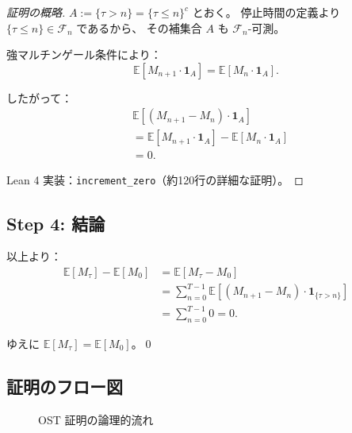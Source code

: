 \documentclass[a4paper,12pt]{ltjsarticle}
\theoremstyle{definition}
\begin{document}
\begin{proof}[証明の概略]
$A := \{\tau > n\} = \{\tau \leq n\}^c$ とおく。
停止時間の定義より $\{\tau \leq n\} \in \mathcal{F}_n$ であるから、
その補集合 $A$ も $\mathcal{F}_n$-可測。

強マルチンゲール条件により：
\[
  \mathbb{E}[M_{n+1} \cdot \mathbf{1}_A] = \mathbb{E}[M_n \cdot \mathbf{1}_A].
\]

したがって：
\begin{align*}
  &\mathbb{E}[(M_{n+1} - M_n) \cdot \mathbf{1}_A] \\
  &= \mathbb{E}[M_{n+1} \cdot \mathbf{1}_A] - \mathbb{E}[M_n \cdot \mathbf{1}_A] \\
  &= 0.
\end{align*}

Lean 4 実装：\texttt{increment\_zero}（約120行の詳細な証明）。
\end{proof}

\subsection{Step 4: 結論}

以上より：
\begin{align*}
  \mathbb{E}[M_\tau] - \mathbb{E}[M_0]
  &= \mathbb{E}[M_\tau - M_0] \\
  &= \sum_{n=0}^{T-1} \mathbb{E}[(M_{n+1} - M_n) \cdot \mathbf{1}_{\{\tau > n\}}] \\
  &= \sum_{n=0}^{T-1} 0 = 0.
\end{align*}

ゆえに $\mathbb{E}[M_\tau] = \mathbb{E}[M_0]$。\qed

\subsection{証明のフロー図}

\begin{figure}[h]
\centering
{}
\caption{OST 証明の論理的流れ}
\end{figure}
\end{document}
